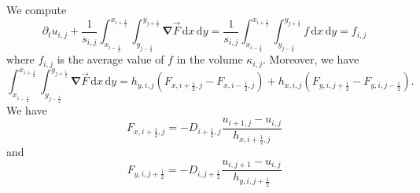 \documentclass[aps,onecolumn]{revtex4}
\newcommand{\half}{\frac{1}{2}}
\newcommand{\myd}{\,\text{d}}
\begin{document}
We compute
\begin{equation}
	\partial_t u_{i,j} + \dfrac{1}{s_{i,j}} \int_{x_{i-\half}}^{x_{i+\half}} \int_{y_{j-\half}}^{y_{j+\half}} {\bm \nabla} \vec{F} \myd x \myd y
	 = \dfrac{1}{s_{i,j}} \int_{x_{i-\half}}^{x_{i+\half}} \int_{y_{j-\half}}^{y_{j+\half}} f \myd x \myd y = f_{i,j}
\end{equation}
where $f_{i,j}$ is the average value of $f$ in the volume $\kappa_{i,j}$.
Moreover, we have
\begin{equation}
\int_{x_{i-\half}}^{x_{i+\half}} \int_{y_{j-\half}}^{y_{j+\half}} {\bm \nabla} \vec{F} \myd x \myd y = 
h_{y,i,j}\left( F_{x,i+\half,j} - F_{x,i-\half,j} \right) + h_{x,i,j}\left( F_{y,i,j+\half} - F_{y,i,j-\half} \right).
\end{equation}
We have
\begin{equation}
F_{x,i+\half,j} = - D_{i+\half,j} \dfrac{u_{i+1,j}-u_{i,j}}{h_{x,i+\half,j}}
\end{equation}
and
\begin{equation}
F_{y,i,j+\half} = - D_{i,j+\half} \dfrac{u_{i,j+1}-u_{i,j}}{h_{y,i,j+\half}}
\end{equation}
\end{document}
